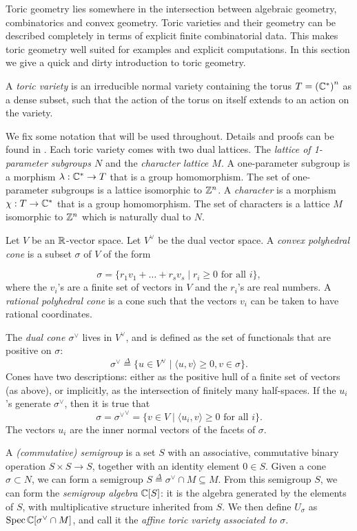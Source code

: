 Toric geometry lies somewhere in the intersection between algebraic geometry, combinatorics and convex geometry. Toric varieties and their geometry can be described completely in terms of explicit finite combinatorial data. This makes toric geometry well suited for examples and explicit computations. In this section we give a quick and dirty introduction to toric geometry.

\begin{definition}
A \emph{toric variety} is an irreducible normal variety containing the torus ${T={(\mathbb{C}^\ast)}^n}$  as a dense subset, such that the action of the torus on itself extends to an action on the variety.
\end{definition}

We fix some notation that will be used throughout. Details and proofs can be found in \cite{cox_toric,fulton_toric}. Each toric variety comes with two dual lattices. The \emph{lattice of 1-parameter subgroups $N$} and the \emph{character lattice $M$}. A one-parameter subgroup is a morphism $\lambda:\mathbb{C} ^\ast \to T$ that is a group homomorphism. The set of one-parameter subgroups is a lattice isomorphic to $\mathbb{Z}^n$. A \emph{character} is a morphism $\chi:T \to \mathbb{C}^\ast$ that is a group homomorphism. The set of characters is a lattice $M$ isomorphic to $\mathbb{Z}^n$ which is naturally dual to $N$.

Let $V$ be an $\mathbb{R}$-vector space. Let $V^\vee$ be the dual vector space. A \emph{convex polyhedral cone} is a subset $\sigma$ of $V$ of the form

$$
\sigma = \{ r_1 v_1 + \dots + r_s v_s \mid r_i \geq 0 \text{ for all } i \},
$$
where the $v_i$'s are a finite set of vectors in $V$ and the $r_i$'s are real numbers. A \emph{rational polyhedral cone} is a cone such that the vectors $v_i$ can be taken to have rational coordinates.

The \emph{dual cone $\sigma^\vee$} lives in $V^\vee$, and is defined as the set of functionals that are positive on $\sigma$:
$$
\sigma^\vee \stackrel{\Delta}{=} \{ u \in V^\vee \mid \langle u,v\rangle \geq 0, v \in \sigma \}.
$$
Cones have two descriptions: either as the positive hull of a finite set of vectors (as above), or implicitly, as the intersection of finitely many half-spaces. If the $u_i$'s generate $\sigma^\vee$, then it is true that
$$
\sigma = {\sigma^\vee}^ \vee  = \{ v \in V \mid \langle u_i,v \rangle \geq 0 \text{ for all } i \}.
$$
The vectors $u_i$ are the inner normal vectors of the facets of $\sigma$.

A \emph{(commutative) semigroup} is a set $S$ with an associative, commutative binary operation $S \times S \to S$, together with an identity element $0 \in S$. Given a cone $\sigma \subset N$, we can form a semigroup $S\stackrel{\Delta}{=} \sigma^\vee \cap M \subseteq M$. From this semigroup $S$, we can form the \emph{semigroup algebra} $\mathbb{C}[S]$: it is the algebra generated by the elements of $S$, with multiplicative structure inherited from $S$. We then define $U_\sigma$ as $\operatorname{Spec} \mathbb{C}[\sigma^\vee \cap M]$, and call it the \emph{affine toric variety associated to $\sigma$}. 

